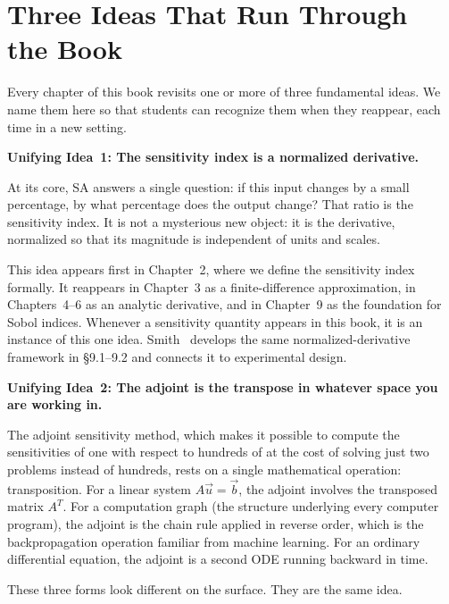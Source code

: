 \section{Three Ideas That Run Through the Book}
\label{sec:threeIdeas}

Every chapter of this book revisits one or more of three
fundamental ideas. We name them here so that students can
recognize them when they reappear, each time in a new setting.

\medskip

\noindent\textbf{Unifying Idea~1: The sensitivity index is a
normalized derivative.}

At its core, SA answers a single question: if this input changes
by a small percentage, by what percentage does the output change?
That ratio is the sensitivity index. It is not a mysterious new
object: it is the derivative, normalized so that its magnitude
is independent of units and scales.

This idea appears first in Chapter~2, where we define the
sensitivity index formally. It reappears in Chapter~3 as a
finite-difference approximation, in Chapters~4--6 as
an analytic derivative, and in Chapter~9 as the foundation
for Sobol indices. Whenever a sensitivity quantity appears
in this book, it is an instance of this one idea.
Smith~\cite{smith2014uncertainty} develops the same normalized-derivative
framework in \S9.1--9.2 and connects it to experimental design.

\medskip

\noindent\textbf{Unifying Idea~2: The adjoint is the transpose
in whatever space you are working in.}

The adjoint sensitivity method, which makes it possible
to compute the sensitivities of one \QOI with respect to
hundreds of \POIs at the cost of solving just two problems
instead of hundreds, rests on a single mathematical operation:
transposition. For a linear system $A\vec{u} = \vec{b}$,
the adjoint involves the transposed matrix $A^T$.
For a computation graph (the structure underlying every
computer program), the adjoint is the chain rule applied in
reverse order, which is the backpropagation operation familiar from
machine learning. For an ordinary differential equation,
the adjoint is a second ODE running backward in time.

These three forms look different on the surface.
They are the same idea.

